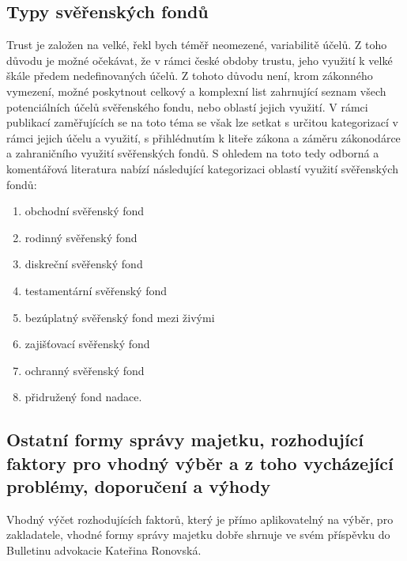 \documentclass{article}
\begin{document}
\newpage
\thispagestyle{smallertextinheader}

\subsection{Typy svěřenských fondů}



Trust je založen na velké, řekl bych téměř neomezené, variabilitě účelů. Z toho důvodu je možné očekávat, že v rámci české obdoby trustu, jeho využití k velké škále předem nedefinovaných účelů. Z tohoto důvodu není, krom zákonného vymezení, možné poskytnout celkový a komplexní list zahrnující seznam všech potenciálních účelů svěřenského fondu, nebo oblastí jejich využití. V rámci publikací zaměřujících se na toto téma se však lze setkat s určitou kategorizací v rámci jejich účelu a využití, s přihlédnutím k liteře zákona a záměru zákonodárce a zahraničního využití svěřenských fondů. S ohledem na toto tedy odborná a komentářová literatura nabízí následující kategorizaci oblastí využití svěřenských fondů:

\begin{enumerate}
\item obchodní svěřenský fond
\item rodinný svěřenský fond
\item diskreční svěřenský fond
\item testamentární svěřenský fond
\item bezúplatný svěřenský fond mezi živými
\item zajišťovací svěřenský fond
\item ochranný svěřenský fond
\item přidružený fond nadace.
\end{enumerate}

\subsection{Ostatní formy správy majetku, rozhodující faktory pro vhodný výběr a z toho vycházející problémy, doporučení a výhody}

Vhodný výčet rozhodujících faktorů, který je přímo aplikovatelný na výběr, pro zakladatele, vhodné formy správy majetku dobře shrnuje ve svém příspěvku do Bulletinu advokacie Kateřina Ronovská.\\
\end{document}

